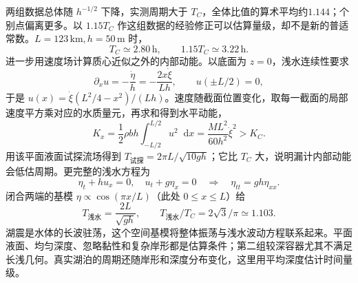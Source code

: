 \documentclass[UTF8,fontset=fandol,a4paper,11pt]{ctexart}
\newcommand{\dd}{\mathop{}\!\mathrm{d}}
\begin{document}
两组数据总体随 $h^{-1/2}$ 下降，实测周期大于 $T_C$，全体比值的算术平均约$1.144$；个别点偏离更多。以 $1.15T_C$ 作这组数据的经验修正可以估算量级，却不是新的普适常数。$L=123\,\mathrm{km},h=50\,\mathrm m$ 时，
\[T_C\simeq2.80\,\mathrm h,\qquad 1.15T_C\simeq3.22\,\mathrm h.\]
进一步用速度场计算质心近似之外的内部动能。以底面为 $z=0$，浅水连续性要求
\[\partial_xu=-\frac{\dot\eta}{h}=-\frac{2x\dot\xi}{Lh},\qquad
u(\pm L/2)=0,\]
于是 $u(x)=\dot\xi(L^2/4-x^2)/(Lh)$。速度随截面位置变化，取每一截面的局部速度平方乘对应的水质量元，再求和得到水平动能，
\[K_x=\frac12\rho bh\int_{-L/2}^{L/2}u^2\dd x
=\frac{ML^2}{60h^2}\dot\xi^2>K_C.\]
用该平面液面试探流场得到 $T_{\text{试探}}=2\pi L/\sqrt{10gh}$；它比 $T_C$ 大，说明漏计内部动能会低估周期。更完整的浅水方程为
\[\eta_t+hu_x=0,\quad u_t+g\eta_x=0
\quad\Longrightarrow\quad\eta_{tt}=gh\eta_{xx}.\]
闭合两端的基模 $\eta\propto\cos(\pi x/L)$（此处 $0\le x\le L$）给
\[T_{\text{浅水}}=\frac{2L}{\sqrt{gh}},\qquad
T_{\text{浅水}}/T_C=2\sqrt3/\pi\simeq1.103.\]
湖震是水体的长波驻荡，这个空间基模将整体振荡与浅水波动方程联系起来。平面液面、均匀深度、忽略黏性和复杂岸形都是估算条件；第二组较深容器尤其不满足长浅几何。真实湖泊的周期还随岸形和深度分布变化，这里用平均深度估计时间量级。
\end{document}
